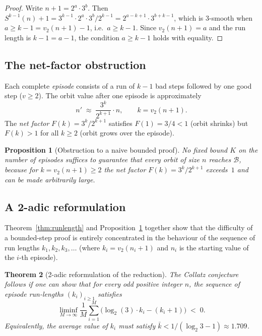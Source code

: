 \documentclass[12pt]{amsart}
\newtheorem{theorem}{Theorem}[section]
\newtheorem{proposition}[theorem]{Proposition}
\theoremstyle{definition}
\newcommand{\basin}{\mathcal{B}}
\begin{document}
\begin{proof}
  Write $n+1 = 2^a \cdot 3^b$.  Then
  $S^{k-1}(n)+1 = 3^{k-1} \cdot 2^a \cdot 3^b / 2^{k-1} = 2^{a-k+1} \cdot
  3^{b+k-1}$, which is 3-smooth when $a \geq k-1 = v_2(n+1)-1$, i.e.\
  $a \geq k-1$.  Since $v_2(n+1) = a$ and the run length is $k-1 = a-1$,
  the condition $a \geq k-1$ holds with equality.
\end{proof}

\subsection{The net-factor obstruction}

Each complete \emph{episode} consists of a run of $k-1$ bad steps followed by
one good step ($v \geq 2$).  The orbit value after one episode is
approximately
\[
  n' \;\approx\; \frac{3^k}{2^{k+1}} \cdot n,
  \qquad k = v_2(n+1).
\]
The \emph{net factor} $F(k) = 3^k / 2^{k+1}$ satisfies $F(1) = 3/4 < 1$
(orbit shrinks) but $F(k) > 1$ for all $k \geq 2$ (orbit grows over the
episode).

\begin{proposition}[Obstruction to a naive bounded proof]
  \label{prop:obstruction}
  No fixed bound $K$ on the number of episodes suffices to guarantee that
  every orbit of size $n$ reaches $\basin$, because for $k = v_2(n+1) \geq 2$
  the net factor $F(k) = 3^k/2^{k+1}$ exceeds~$1$ and can be made arbitrarily
  large.
\end{proposition}

\subsection{A 2-adic reformulation}

Theorem~\ref{thm:runlength} and Proposition~\ref{prop:obstruction} together
show that the difficulty of a bounded-step proof is entirely concentrated in
the behaviour of the sequence of run lengths $k_1, k_2, k_3, \ldots$ (where
$k_i = v_2(n_i + 1)$ and $n_i$ is the starting value of the $i$-th episode).

\begin{theorem}[2-adic reformulation of the reduction]\label{thm:2adicreform}
  The Collatz conjecture follows if one can show that for every odd positive
  integer $n$, the sequence of episode run-lengths $(k_i)_{i \geq 1}$
  satisfies
  \[
    \liminf_{M \to \infty}
    \frac{1}{M} \sum_{i=1}^{M}
    \bigl( \log_2(3) \cdot k_i - (k_i + 1) \bigr)
    \;<\; 0.
  \]
  Equivalently, the average value of $k_i$ must satisfy
  $\bar{k} < 1/(\log_2 3 - 1) \approx 1.709$.
\end{theorem}
\end{document}
